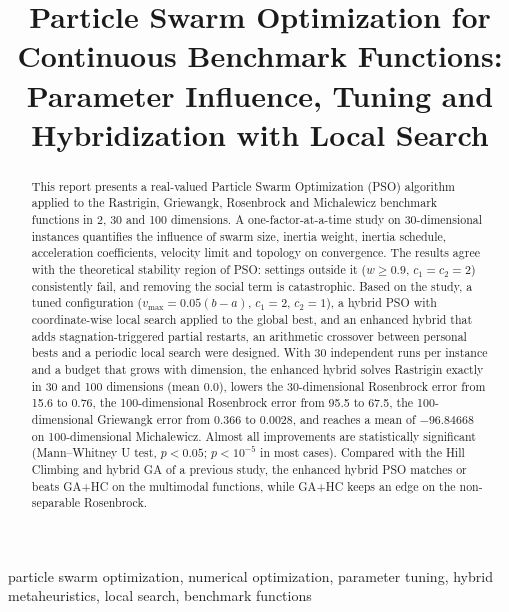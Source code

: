 \documentclass[conference]{IEEEtran}
\begin{document}
\title{Particle Swarm Optimization for Continuous Benchmark Functions:\\
Parameter Influence, Tuning and Hybridization with Local Search}

\author{
}

\maketitle

\begin{abstract}
This report presents a real-valued Particle Swarm Optimization (PSO)
algorithm applied to the Rastrigin, Griewangk, Rosenbrock and Michalewicz
benchmark functions in 2, 30 and 100 dimensions. A one-factor-at-a-time
study on 30-dimensional instances quantifies the influence of swarm size,
inertia weight, inertia schedule, acceleration coefficients, velocity limit
and topology on convergence. The results agree with the theoretical
stability region of PSO: settings outside it ($w\geq0.9$, $c_1=c_2=2$)
consistently fail, and removing the social term is catastrophic. Based on
the study, a tuned configuration ($v_{\max}=0.05(b-a)$, $c_1=2$, $c_2=1$),
a hybrid PSO with coordinate-wise local search applied to the global
best, and an enhanced hybrid that adds stagnation-triggered partial
restarts, an arithmetic crossover between personal bests and a periodic
local search were designed. With 30 independent runs per instance and a
budget that grows with dimension, the enhanced hybrid solves Rastrigin
exactly in 30 and 100 dimensions (mean $0.0$), lowers the 30-dimensional
Rosenbrock error from 15.6 to 0.76, the 100-dimensional Rosenbrock error
from 95.5 to 67.5, the 100-dimensional Griewangk error from 0.366 to
0.0028, and reaches a mean of $-96.84668$ on 100-dimensional
Michalewicz. Almost all improvements are statistically significant
(Mann--Whitney U test, $p<0.05$; $p<10^{-5}$ in most cases). Compared with
the Hill Climbing and hybrid GA of a previous study, the enhanced hybrid
PSO matches or beats GA+HC on the multimodal functions, while GA+HC keeps
an edge on the non-separable Rosenbrock.
\end{abstract}

\begin{IEEEkeywords}
particle swarm optimization, numerical optimization, parameter tuning,
hybrid metaheuristics, local search, benchmark functions
\end{IEEEkeywords}
\end{document}
